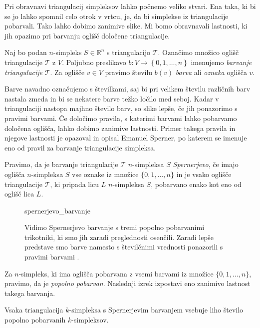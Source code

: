 \documentclass[mat1]{fmfdelo}
\newcommand{\R}{\mathbb R}
\newcommand{\0}{\underline{0}}
\newcommand{\pT}{\mathcal T}
\begin{document}
Pri obravnavi triangulacij simpleksov lahko počnemo veliko stvari. Ena taka, ki bi se jo lahko spomnil celo otrok v vrtcu, je, da bi simplekse iz triangulacije pobarvali. Tako lahko dobimo zanimive slike. Mi bomo obravnavali lastnosti, ki jih opazimo pri barvanju oglišč določene triangulacije.
\begin{definicija}
Naj bo podan $n$-simpleks $S \in \R^n$ s triangulacijo $\pT$. Označimo množico oglišč triangulacije $\pT$ z $V$. Poljubno preslikavo $b : V \to \left \{0, 1, \dots, n \right \} $ imenujemo \emph{barvanje triangulacije} $\pT$. Za oglišče $v \in V$ pravimo številu $b(v)$ \emph{barva} ali \emph{oznaka} oglišča $v$.
\end{definicija}
Barve navadno označujemo s številkami, saj bi pri velikem številu različnih barv nastala zmeda in bi se nekatere barve težko ločilo med seboj. Kadar v triangulaciji nastopa majhno število barv, so slike lepše, če jih ponazorimo s pravimi barvami. Če določimo pravila, s katerimi barvami lahko pobarvamo določena oglišča, lahko dobimo zanimive lastnosti. Primer takega pravila in njegove lastnosti je opazoval in opisal Emanuel Sperner, po katerem se imenuje eno od pravil za barvanje triangulacije simpleksa.
\begin{definicija}
Pravimo, da je barvanje triangulacije $\pT$ $n$-simpleksa $S$ \emph{Spernerjevo}, če imajo oglišča $n$-simpleksa $S$ vse oznake iz množice $\{ 0, 1, \dots, n \}$ in je vsako oglišče triangulacije $\pT$, ki pripada licu $L$ $n$-simpleksa $S$, pobarvano enako kot eno od oglišč lica $L$.
\end{definicija}
\begin{figure}[h!]    
	\centering
		{spernerjevo_barvanje}
	\caption{Vidimo Spernerjevo barvanje s tremi popolno pobarvanimi trikotniki, ki smo jih zaradi preglednosti osenčili. Zaradi lepše predstave smo barve namesto s številčnimi vrednosti ponazorili s pravimi barvami .}
\end{figure}
Za $n$-simpleks, ki ima oglišča pobarvana z vsemi barvami iz množice $\{ 0, 1, \dots, n \}$, pravimo, da je \emph{popolno pobarvan}. Naslednji izrek izpostavi eno zanimivo lastnost takega barvanja.
\begin{lema}\label{izr:sperner}
Vsaka triangulacija $k$-simpleksa s Spernerjevim barvanjem vsebuje liho število popolno pobarvanih $k$-simpleksov.
\end{lema}
\end{document}
